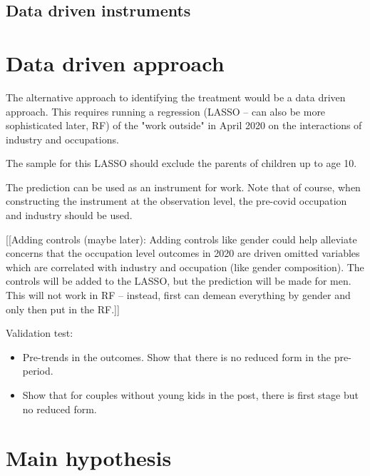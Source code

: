 \documentclass{article}
\begin{document}
\subsection{Data driven instruments}

\section{Data driven approach}
The alternative approach to identifying the treatment would be a data driven approach. This requires running a regression (LASSO -- can also be more sophisticated later, RF) of the "work outside" in April 2020 on the interactions of industry and occupations. 

The sample for this LASSO should exclude the parents of children up to age 10.

The prediction can be used as an instrument for work. Note that of course, when constructing the instrument at the observation level, the pre-covid occupation and industry should be used. 

[[Adding controls (maybe later): Adding controls like gender could help alleviate concerns that the occupation level outcomes in 2020 are driven omitted variables which are correlated with industry and occupation (like gender composition). The controls will be added to the LASSO, but the prediction will be made for men. This will not work in RF -- instead, first can demean everything by gender and only then put in the RF.]]  

Validation test:
\begin{itemize}
    \item Pre-trends in the outcomes. Show that there is no reduced form in the pre-period. 
    \item Show that for couples without young kids in the post, there is first stage but no reduced form.
    
\end{itemize}

\section{Main hypothesis}
\end{document}
